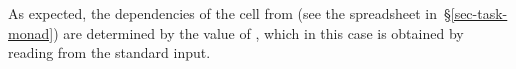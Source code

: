 \noindent
As expected, the dependencies of the cell  from  (see the
spreadsheet in~\S\ref{sec-task-monad}) are determined by the value of ,
which in this case is obtained by reading from the standard input.


%
%



